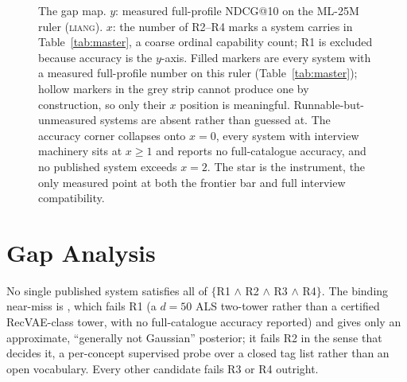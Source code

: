 \documentclass[manuscript,screen]{acmart}
\begin{document}
\begin{figure}[t]
\caption{The gap map. $y$: measured full-profile NDCG@10 on the ML-25M ruler (\textsc{liang}). $x$: the number of R2--R4 marks a system carries in Table~\ref{tab:master}, a coarse ordinal capability count; R1 is excluded because accuracy is the $y$-axis. Filled markers are every system with a measured full-profile number on this ruler (Table~\ref{tab:master}); hollow markers in the grey strip cannot produce one by construction, so only their $x$ position is meaningful. Runnable-but-unmeasured systems are absent rather than guessed at. The accuracy corner collapses onto $x{=}0$, every system with interview machinery sits at $x\ge1$ and reports no full-catalogue accuracy, and no published system exceeds $x{=}2$. The star is the instrument, the only measured point at both the frontier bar and full interview compatibility.}
\label{fig:gapmap}
\end{figure}

\section{Gap Analysis}\label{sec:gap}

No single published system satisfies all of $\{$R1 $\wedge$ R2 $\wedge$ R3 $\wedge$ R4$\}$. The binding near-miss is \citet{biyik2023soft}, which fails R1 (a $d{=}50$ ALS two-tower rather than a certified RecVAE-class tower, with no full-catalogue accuracy reported) and gives only an approximate, ``generally not Gaussian'' posterior; it fails R2 in the sense that decides it, a per-concept supervised probe over a closed tag list rather than an open vocabulary. Every other candidate fails R3 or R4 outright.
\end{document}
